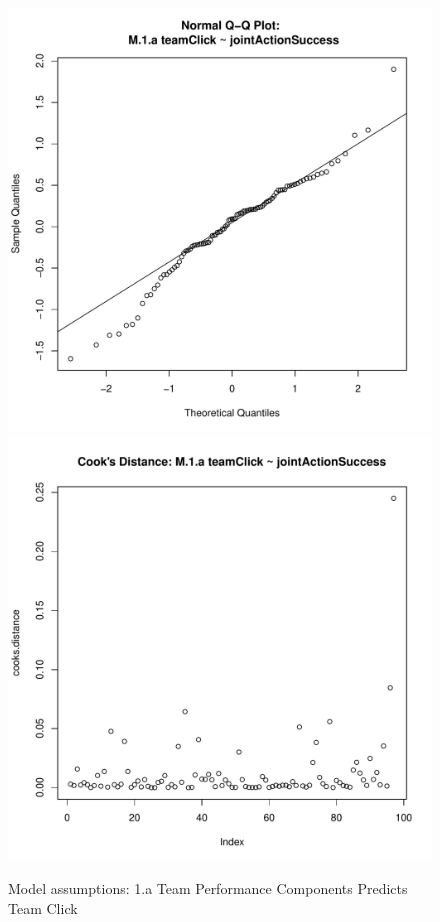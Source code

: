\begin{figure}[htbp]
     \includegraphics[scale =.4]{images/MLM1aQQPlot.pdf}
     \includegraphics[scale =.4]{images/MLM1aCooksD.pdf}
     \caption{Model assumptions: 1.a Team Performance Components Predicts Team Click}
     \label{fig:MLM1aAssumptions}
 \end{figure}



